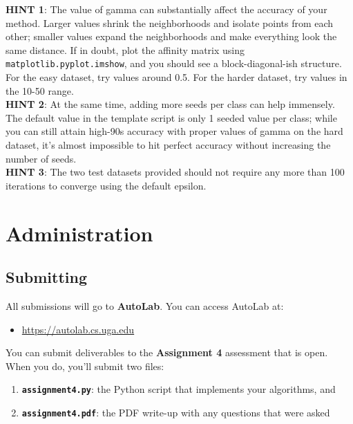 \documentclass[paper=a4, fontsize=11pt]{scrartcl} %
\numberwithin{figure}{section} %
\numberwithin{table}{section} %
\begin{document}
\textbf{HINT 1}: The value of gamma can substantially affect the accuracy of your method. Larger values shrink the neighborhoods and isolate points from each other; smaller values expand the neighborhoods and make everything look the same distance. If in doubt, plot the affinity matrix using \texttt{matplotlib.pyplot.imshow}, and you should see a block-diagonal-ish structure. For the easy dataset, try values around 0.5. For the harder dataset, try values in the 10-50 range. \\

\textbf{HINT 2}: At the same time, adding more seeds per class can help immensely. The default value in the template script is only 1 seeded value per class; while you can still attain high-90s accuracy with proper values of gamma on the hard dataset, it's almost impossible to hit perfect accuracy without increasing the number of seeds. \\

\textbf{HINT 3}: The two test datasets provided should not require any more than 100 iterations to converge using the default epsilon. \\

\section*{Administration}
\setcounter{subsection}{0}

\subsection{Submitting}

All submissions will go to \textbf{AutoLab}. You can access AutoLab at:

\begin{itemize}
	\item \url{https://autolab.cs.uga.edu}
\end{itemize}
	
You can submit deliverables to the \textbf{Assignment 4} assessment that is open. When you do, you'll submit two files:

\begin{enumerate}
	\item \texttt{\textbf{assignment4.py}}: the Python script that implements your algorithms, and
	\item \texttt{\textbf{assignment4.pdf}}: the PDF write-up with any questions that were asked
\end{enumerate}
\end{document}
